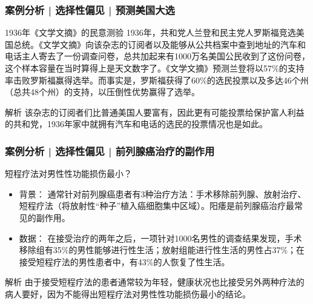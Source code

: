\begin{frame}
  \frametitle{案例分析 | 选择性偏见 | 预测美国大选}
  \begin{block}{1936年《文学文摘》的民意测验}
    1936年，共和党人兰登和民主党人罗斯福竞选美国总统。《文学文摘》向该杂志的订阅者以及能够从公共档案中查到地址的汽车和电话主人寄去了一份调查问卷，总共加起来有1000万名美国公民收到了这份问卷，这个样本容量在当时算得上是天文数字了。《文学文摘》预测兰登将以57\%的支持率击败罗斯福赢得选举。而事实是，罗斯福获得了60\%的选民投票以及多达46个州（总共48个州）的支持，以压倒性优势赢得了选举。
  \end{block}
  \pause
  \begin{block}{解析}
    该杂志的订阅者们比普通美国人要富有，因此更有可能投票给保护富人利益的共和党，1936年家中就拥有汽车和电话的选民的投票情况也是如此。
  \end{block}
\end{frame}

\begin{frame}
  \frametitle{案例分析 | 选择性偏见 | 前列腺癌治疗的副作用}
  \begin{block}{短程疗法对男性性功能损伤最小？}
    \begin{itemize}
      \item 背景：
通常针对前列腺癌患者有3种治疗方法：手术移除前列腺、放射治疗、短程疗法（将放射性“种子”植入癌细胞集中区域）。阳痿是前列腺癌治疗最常见的副作用。
      \item 数据： 在接受治疗的两年之后，一项针对1000名男性的调查结果发现，手术移除组有35\%的男性能够进行性生活；放射组能进行性生活的男性占37\%；在接受短程疗法的男性患者中，有43\%的人恢复了性生活。
    \end{itemize}
  \end{block}
  \pause
  \begin{block}{解析}
    由于接受短程疗法的患者通常较为年轻，健康状况也比接受另外两种疗法的病人要好，因为不能得出短程疗法对男性性功能损伤最小的结论。
  \end{block}
\end{frame}

